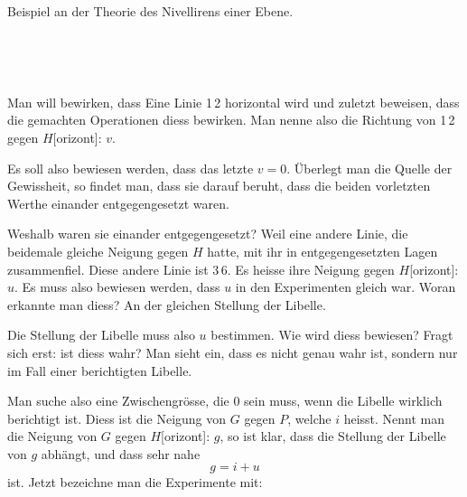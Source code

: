 \begin{center}Beispiel an der Theorie des Nivellirens einer Ebene.\end{center}


\begin{center}
\begin{minipage}[t]{.52\linewidth}\centering{}\\[8pt]\end{minipage}\hfill
\begin{minipage}[t]{.39\linewidth}\centering\textls{[Libelle]}\\[8pt]\end{minipage}
\end{center}



Man will bewirken, dass Eine Linie 1\,2 horizontal wird und zuletzt beweisen, dass die gemachten Operationen diess bewirken. Man nenne also die Richtung von 1\,2 gegen $H$[orizont]: $v$.

Es soll also bewiesen werden, dass das letzte $v=0$. \"Uberlegt man die Quelle der Gewissheit, so findet man, dass sie darauf beruht, dass die beiden vorletzten Werthe einander entgegengesetzt waren.

Weshalb waren sie einander entgegengesetzt? Weil eine andere Linie, die beidemale gleiche Neigung gegen $H$ hatte, mit ihr in entgegengesetzten Lagen zusammenfiel. Diese andere Linie ist 3\,6. Es heisse ihre Neigung gegen $H$[orizont]: $u$. Es muss also bewiesen werden, dass $u$ in den Experimenten gleich war. Woran erkannte man diess? An der gleichen Stellung der Libelle.

Die Stellung der Libelle muss also $u$ bestimmen. Wie wird diess bewiesen? Fragt sich erst: ist diess wahr? Man sieht ein, dass es nicht genau wahr ist, sondern nur im Fall einer berichtigten Libelle.

Man suche also eine Zwischengr\"osse, die 0 sein muss, wenn die Libelle wirklich berichtigt ist. Diess ist die Neigung von $G$ gegen $P$, welche $i$ heisst. Nennt man die Neigung von $G$ gegen $H$[orizont]: $g$, so ist klar, dass die Stellung der Libelle von $g$ abh\"angt, und dass sehr nahe
\[
g = i + u
\]
ist. Jetzt bezeichne man die Experimente mit:
